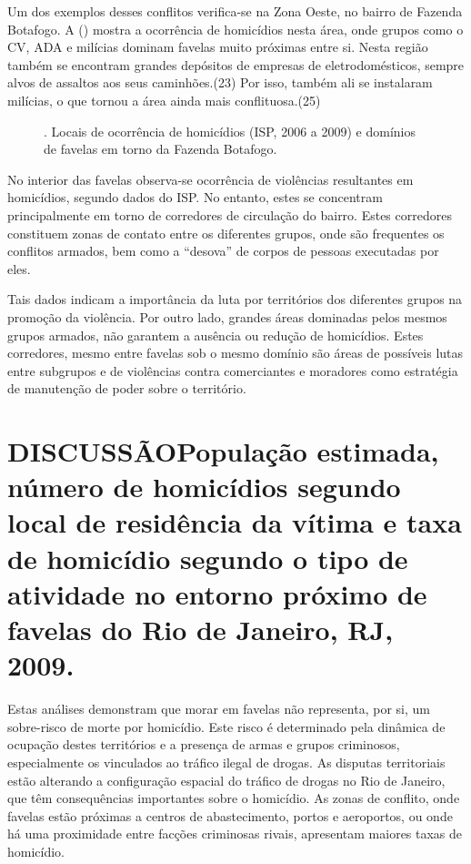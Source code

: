\documentclass{article}
\begin{document}
Um dos exemplos desses conflitos verifica-se na Zona Oeste, no bairro de Fazenda
Botafogo. A ()
mostra a ocorrência de homicídios nesta área, onde grupos como o CV, ADA e
milícias dominam favelas muito próximas entre si. Nesta região também se
encontram grandes depósitos de empresas de eletrodomésticos, sempre alvos de
assaltos aos seus caminhões.(23)
Por isso, também ali se instalaram milícias, o que tornou a área ainda mais
conflituosa.(25)

\begin{figure}
\caption{. Locais de ocorrência de homicídios (ISP, 2006 a 2009) e domínios de
favelas em torno da Fazenda Botafogo.}
\end{figure}

No interior das favelas observa-se ocorrência de violências resultantes em
homicídios, segundo dados do ISP. No entanto, estes se concentram principalmente
em torno de corredores de circulação do bairro. Estes corredores constituem
zonas de contato entre os diferentes grupos, onde são frequentes os conflitos
armados, bem como a “desova” de corpos de pessoas executadas por eles.

Tais dados indicam a importância da luta por territórios dos diferentes grupos
na promoção da violência. Por outro lado, grandes áreas dominadas pelos mesmos
grupos armados, não garantem a ausência ou redução de homicídios. Estes
corredores, mesmo entre favelas sob o mesmo domínio são áreas de possíveis lutas
entre subgrupos e de violências contra comerciantes e moradores como estratégia
de manutenção de poder sobre o território.

\section{DISCUSSÃOPopulação estimada, número de homicídios segundo local de
residência da vítima e taxa de homicídio segundo o tipo de atividade no entorno
próximo de favelas do Rio de Janeiro, RJ, 2009.}

Estas análises demonstram que morar em favelas não representa, por si, um
sobre-risco de morte por homicídio. Este risco é determinado pela dinâmica de
ocupação destes territórios e a presença de armas e grupos criminosos,
especialmente os vinculados ao tráfico ilegal de drogas. As disputas
territoriais estão alterando a configuração espacial do tráfico de drogas no Rio
de Janeiro, que têm consequências importantes sobre o homicídio. As zonas de
conflito, onde favelas estão próximas a centros de abastecimento, portos e
aeroportos, ou onde há uma proximidade entre facções criminosas rivais,
apresentam maiores taxas de homicídio.
\end{document}
